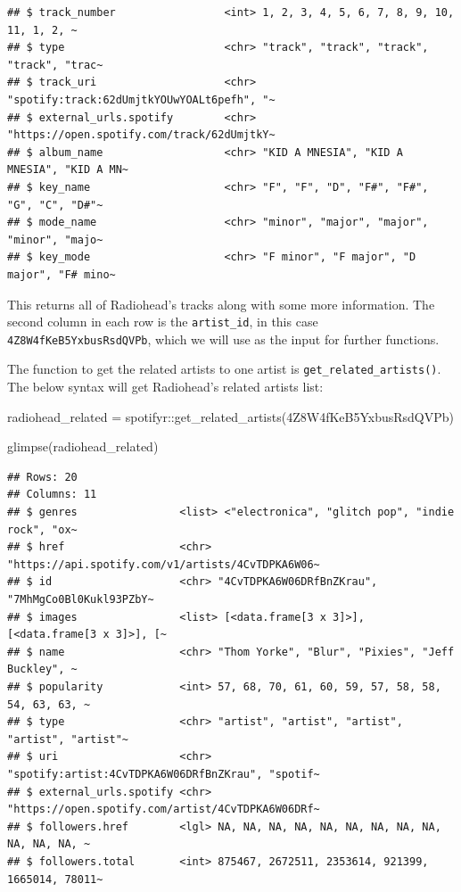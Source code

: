 \documentclass[
]{book}
\newenvironment{Shaded}{\begin{snugshade}}{\end{snugshade}}
\newcommand{\FunctionTok}[1]{\textcolor[rgb]{0.00,0.00,0.00}{#1}}
\newcommand{\NormalTok}[1]{#1}
\newcommand{\OtherTok}[1]{\textcolor[rgb]{0.56,0.35,0.01}{#1}}
\newcommand{\SpecialCharTok}[1]{\textcolor[rgb]{0.00,0.00,0.00}{#1}}
\newcommand{\StringTok}[1]{\textcolor[rgb]{0.31,0.60,0.02}{#1}}
\begin{document}
\begin{verbatim}
## $ track_number                 <int> 1, 2, 3, 4, 5, 6, 7, 8, 9, 10, 11, 1, 2, ~
## $ type                         <chr> "track", "track", "track", "track", "trac~
## $ track_uri                    <chr> "spotify:track:62dUmjtkYOUwYOALt6pefh", "~
## $ external_urls.spotify        <chr> "https://open.spotify.com/track/62dUmjtkY~
## $ album_name                   <chr> "KID A MNESIA", "KID A MNESIA", "KID A MN~
## $ key_name                     <chr> "F", "F", "D", "F#", "F#", "G", "C", "D#"~
## $ mode_name                    <chr> "minor", "major", "major", "minor", "majo~
## $ key_mode                     <chr> "F minor", "F major", "D major", "F# mino~
\end{verbatim}

This returns all of Radiohead's tracks along with some more information. The second column in each row is the \texttt{artist\_id}, in this case \texttt{4Z8W4fKeB5YxbusRsdQVPb}, which we will use as the input for further functions.

The function to get the related artists to one artist is \texttt{get\_related\_artists()}. The below syntax will get Radiohead's related artists list:

\begin{Shaded}
\begin{Highlighting}[]
\NormalTok{radiohead\_related }\OtherTok{=}\NormalTok{ spotifyr}\SpecialCharTok{::}\FunctionTok{get\_related\_artists}\NormalTok{(}\StringTok{\textquotesingle{}4Z8W4fKeB5YxbusRsdQVPb\textquotesingle{}}\NormalTok{)}

\FunctionTok{glimpse}\NormalTok{(radiohead\_related)}
\end{Highlighting}
\end{Shaded}

\begin{verbatim}
## Rows: 20
## Columns: 11
## $ genres                <list> <"electronica", "glitch pop", "indie rock", "ox~
## $ href                  <chr> "https://api.spotify.com/v1/artists/4CvTDPKA6W06~
## $ id                    <chr> "4CvTDPKA6W06DRfBnZKrau", "7MhMgCo0Bl0Kukl93PZbY~
## $ images                <list> [<data.frame[3 x 3]>], [<data.frame[3 x 3]>], [~
## $ name                  <chr> "Thom Yorke", "Blur", "Pixies", "Jeff Buckley", ~
## $ popularity            <int> 57, 68, 70, 61, 60, 59, 57, 58, 58, 54, 63, 63, ~
## $ type                  <chr> "artist", "artist", "artist", "artist", "artist"~
## $ uri                   <chr> "spotify:artist:4CvTDPKA6W06DRfBnZKrau", "spotif~
## $ external_urls.spotify <chr> "https://open.spotify.com/artist/4CvTDPKA6W06DRf~
## $ followers.href        <lgl> NA, NA, NA, NA, NA, NA, NA, NA, NA, NA, NA, NA, ~
## $ followers.total       <int> 875467, 2672511, 2353614, 921399, 1665014, 78011~
\end{verbatim}
\end{document}
